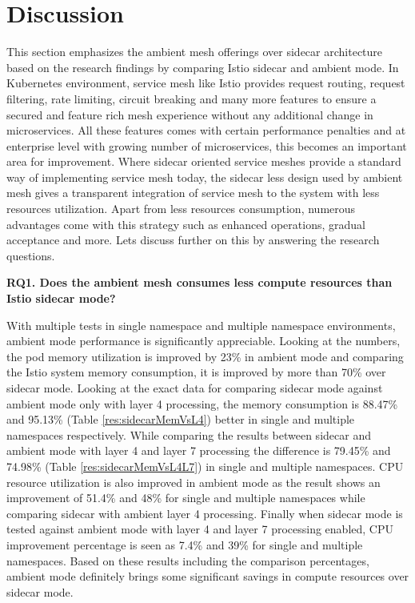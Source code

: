 \section{Discussion}
This section emphasizes the ambient mesh offerings over sidecar architecture based on the research findings by comparing Istio sidecar and ambient mode. In Kubernetes environment, service mesh like Istio provides request routing, request filtering, rate limiting, circuit breaking and many more features to ensure a secured and feature rich mesh experience without any additional change in microservices. All these features comes with certain performance penalties and at enterprise level with growing number of microservices, this becomes an important area for improvement. Where sidecar oriented service meshes provide a standard way of implementing service mesh today, the sidecar less design used by ambient mesh gives a transparent integration of service mesh to the system with less resources utilization. Apart from less resources consumption, numerous advantages come with this strategy such as enhanced operations, gradual acceptance and more. Lets discuss further on this by answering the research questions.

\textbf{RQ1. Does the ambient mesh consumes less compute resources than Istio sidecar mode?}

With multiple tests in single namespace and multiple namespace environments, ambient mode performance is significantly appreciable. Looking at the numbers, the pod memory utilization is improved by 23\% in ambient mode and comparing the Istio system memory consumption, it is improved by more than 70\% over sidecar mode. Looking at the exact data for comparing sidecar mode against ambient mode only with layer 4 processing, the memory consumption is 88.47\% and 95.13\% (Table \ref{res:sidecarMemVsL4}) better in single and multiple namespaces respectively. While comparing the results between sidecar and ambient mode with layer 4 and layer 7 processing the difference is 79.45\% and 74.98\% (Table \ref{res:sidecarMemVsL4L7}) in single and multiple namespaces. CPU resource utilization is also improved in ambient mode as the result shows an improvement of 51.4\% and 48\% for single and multiple namespaces while comparing sidecar with ambient layer 4 processing. Finally when sidecar mode is tested against ambient mode with layer 4 and layer 7 processing enabled, CPU improvement percentage is seen as 7.4\% and 39\% for single and multiple namespaces. Based on these results including the comparison percentages, ambient mode definitely brings some significant savings in compute resources over sidecar mode.

